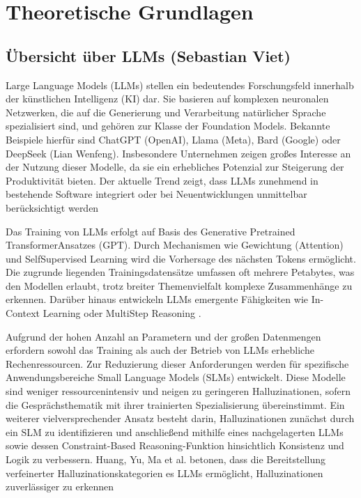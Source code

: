 \section{Theoretische Grundlagen}

\subsection{Übersicht über LLMs (Sebastian Viet)}

Large Language Models (LLMs) stellen ein bedeutendes Forschungsfeld innerhalb
der künstlichen Intelligenz (KI) dar. Sie basieren auf komplexen neuronalen
Netzwerken, die auf die Generierung und Verarbeitung natürlicher Sprache
spezialisiert sind, und gehören zur Klasse der Foundation Models. Bekannte
Beispiele hierfür sind ChatGPT (OpenAI), Llama (Meta), Bard (Google) oder
DeepSeek (Lian Wenfeng). Insbesondere Unternehmen zeigen großes Interesse an
der Nutzung dieser Modelle, da sie ein erhebliches Potenzial zur Steigerung
der Produktivität bieten. Der aktuelle Trend zeigt, dass LLMs zunehmend in
bestehende Software integriert oder bei Neuentwicklungen unmittelbar
berücksichtigt werden \autocites[Vgl.][S. 1-2,5]{lu2024taxonomy}[S. 1-2]{minaee2024survey}

Das Training von LLMs erfolgt auf Basis des Generative Pretrained
TransformerAnsatzes (GPT). Durch Mechanismen wie Gewichtung (Attention) und
SelfSupervised Learning wird die Vorhersage des nächsten Tokens ermöglicht.
Die zugrunde liegenden Trainingsdatensätze umfassen oft mehrere Petabytes, was
den Modellen erlaubt, trotz breiter Themenvielfalt komplexe Zusammenhänge zu
erkennen. Darüber hinaus entwickeln LLMs emergente Fähigkeiten wie In-Context
Learning oder MultiStep Reasoning \autocites[Vgl.][S. 6-10]{lu2024taxonomy}{lu2024taxonomy}[S. 1-2]{minaee2024survey}[S. 1-2]{naveed2024overview}.

Aufgrund der hohen Anzahl an Parametern und der großen Datenmengen erfordern
sowohl das Training als auch der Betrieb von LLMs erhebliche Rechenressourcen.
Zur Reduzierung dieser Anforderungen werden für spezifische Anwendungsbereiche
Small Language Models (SLMs) entwickelt. Diese Modelle sind weniger
ressourcenintensiv und neigen zu geringeren Halluzinationen, sofern die
Gesprächsthematik mit ihrer trainierten Spezialisierung übereinstimmt. Ein
weiterer vielversprechender Ansatz besteht darin, Halluzinationen zunächst
durch ein SLM zu identifizieren und anschließend mithilfe eines nachgelagerten
LLMs sowie dessen Constraint-Based Reasoning-Funktion hinsichtlich Konsistenz
und Logik zu verbessern. Huang, Yu, Ma et al. betonen, dass die Bereitstellung
verfeinerter Halluzinationskategorien es LLMs ermöglicht, Halluzinationen
zuverlässiger zu erkennen \autocites[Vgl.][]{kelbert2023llm}{huang2024hallucination}[S. 6-14]{hu2024slm}

